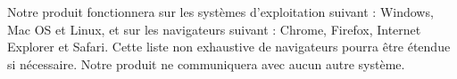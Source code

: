 Notre produit fonctionnera sur les systèmes d'exploitation suivant : Windows, Mac OS et Linux, et sur les navigateurs suivant : Chrome, Firefox, Internet Explorer et Safari. Cette liste non exhaustive de navigateurs pourra être étendue si nécessaire.  Notre produit ne communiquera avec aucun autre système.


